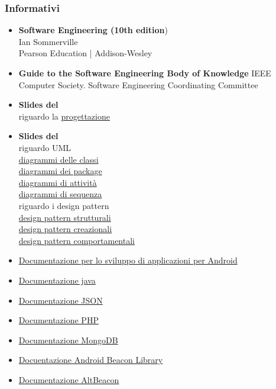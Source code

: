 \subsubsection{Informativi}
\begin{itemize}
	\item \textbf{Software Engineering (10th edition}) \\
	Ian Sommerville \\
	Pearson Education | Addison-Wesley
	\item \textbf{Guide to the Software Engineering Body of Knowledge}
	IEEE Computer Society. Software Engineering Coordinating Committee
	\item \textbf{Slides del \COMMITTENTE} \\ riguardo la  \href{http://www.math.unipd.it/~tullio/IS-1/2015/Dispense/L07.pdf}{progettazione}
	\item \textbf{Slides del \CARDIN} \\ riguardo UML \\ 	
	\href{http://www.math.unipd.it/~tullio/IS-1/2015/Dispense/E03.pdf}{diagrammi delle classi} \\
	\href{http://www.math.unipd.it/~tullio/IS-1/2015/Dispense/E04.pdf}{diagrammi dei package} \\
	\href{http://www.math.unipd.it/~tullio/IS-1/2015/Dispense/E06.pdf}{diagrammi di attività} \\
	\href{http://www.math.unipd.it/~tullio/IS-1/2015/Dispense/E05.pdf}{diagrammi di sequenza} \\
	riguardo i design pattern \\
	\href{http://www.math.unipd.it/~tullio/IS-1/2015/Dispense/E07.pdf}{design pattern strutturali} \\
	\href{http://www.math.unipd.it/~tullio/IS-1/2015/Dispense/E08.pdf}{design pattern creazionali} \\ 
	\href{http://www.math.unipd.it/~tullio/IS-1/2015/Dispense/E09.pdf}{design pattern comportamentali}
	
	\item \href{https://developer.android.com/index.html}{Documentazione per lo sviluppo di applicazioni per Android}
	\item \href{http://www.oracle.com/technetwork/java/javase/documentation/api-jsp-136079.html}{Documentazione java}
	\item \href{http://www.json.org/}{Documentazione JSON}
	\item \href{http://php.net/manual/en/}{Documentazione PHP}
	\item \href{https://docs.mongodb.com/?_ga=1.222274328.1848916898.1465206317}{Documentazione MongoDB}
	\item \href{http://altbeacon.github.io/android-beacon-library/}{Docuentazione Android Beacon Library}
	\item \href{https://github.com/AltBeacon/android-beacon-library}{Documentazione AltBeacon}
	
\end{itemize}
